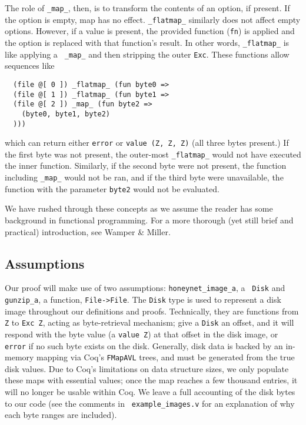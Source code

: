 \documentclass[nocopyrightspace]{sigplanconf}
\begin{document}
The role of {\tt \_map\_}, then, is to transform the contents of an option, if
present. If the option is empty, map has no effect. {\tt \_flatmap\_}
similarly does not affect empty options. However, if a value is present, the
provided function ({\tt fn}) is applied and the option is replaced with that
function's result. In other words, {\tt \_flatmap\_} is like applying a {\tt
\_map\_} and then stripping the outer {\tt Exc}. These functions allow
sequences like

\begin{lstlisting}
  (file @[ 0 ]) _flatmap_ (fun byte0 =>
  (file @[ 1 ]) _flatmap_ (fun byte1 =>
  (file @[ 2 ]) _map_ (fun byte2 =>
    (byte0, byte1, byte2)
  )))
\end{lstlisting}

which can return either {\tt error} or {\tt value (Z, Z, Z)} (all three bytes
present.) If the first byte was not present, the outer-most {\tt \_flatmap\_}
would not have executed the inner function. Similarly, if the second byte were
not present, the function including {\tt \_map\_} would not be ran, and if the
third byte were unavailable, the function with the parameter {\tt byte2} would
not be evaluated.

We have rushed through these concepts as we assume the reader has some
background in functional programming. For a more thorough (yet still brief and
practical) introduction, see Wamper \& Miller\cite{scala}.

\subsection{Assumptions}
Our proof will make use of two assumptions: {\tt honeynet\_image\_a}, a {\tt
Disk} and {\tt gunzip\_a}, a function, {\tt File->File}. The {\tt Disk} type
is used to represent a disk image throughout our definitions and proofs.
Technically, they are functions from {\tt Z} to {\tt Exc Z}, acting as
byte-retrieval mechanism; give a {\tt Disk} an offset, and it will respond
with the byte value (a {\tt value Z}) at that offset in the disk image, or
{\tt error} if no such byte exists on the disk. Generally, disk data is backed
by an in-memory mapping via Coq's {\tt FMapAVL} trees, and must be generated
from the true disk values. Due to Coq's limitations on data structure sizes,
we only populate these maps with essential values; once the map reaches a few
thousand entries, it will no longer be usable within Coq. We leave a full
accounting of the disk bytes to our code (see the comments in {\tt
example\_images.v} for an explanation of why each byte ranges are included).
\end{document}
